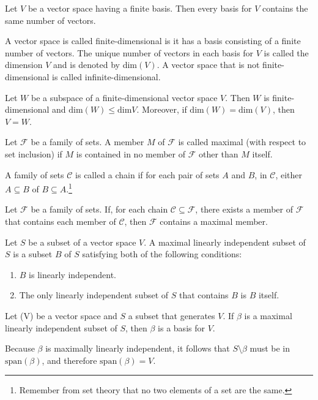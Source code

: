 \documentclass[nobib,notoc]{tufte-handout}
\begin{document}
\begin{cor}
	Let \(V\) be a vector space having a finite basis. Then every basis for \(V\) contains the same number of vectors.
\end{cor}
\begin{defi}[dimension]
A vector space is called finite-dimensional is it has a basis consisting of a finite number of vectors. The unique number of vectors in each basis for \(V\) is called the dimension \(V\) and is denoted by dim\((V)\). A vector space that is not finite-dimensional is called infinite-dimensional.
\end{defi}
\begin{cor}
	Let \(W\) be a subspace of a finite-dimensional vector space \(V\). Then \(W\) is finite-dimensional and \(\text{dim}(W)\leq\text{dim}V\). Moreover, if \(\text{dim}(W)=\text{dim}(V)\), then \(V=W\).
\end{cor}
\begin{defi}
	Let \(\mathcal{F}\) be a family of sets. A member \(M\) of \(\mathcal{F}\) is called maximal (with respect to set inclusion) if \(M\) is contained in no member of \(\mathcal{F}\) other than \(M\) itself.
\end{defi}
\begin{defi}[Chain]
	A family of sets \(\mathcal{C}\) is called a chain if for each pair of sets \(A\) and \(B\), in \(\mathcal{C}\), either \(A\subseteq B\) of \(B\subseteq A\).\footnote{Remember from set theory that no two elements of a set are the same.}
\end{defi}
\begin{defi}
	Let \(\mathcal{F}\) be a family of sets. If, for each chain \(\mathcal{C}\subseteq\mathcal{F}\), there exists a member of \(\mathcal{F}\) that contains each member of \(\mathcal{C}\), then \(\mathcal{F}\) contains a maximal member.
\end{defi}
\begin{defi}
	Let \(S\) be a subset of a vector space \(V\). A maximal linearly independent subset of \(S\) is a subset \(B\) of \(S\) satisfying both of the following conditions:
	\begin{enumerate}
		\item \(B\) is linearly independent.
		\item The only linearly independent subset of \(S\) that contains \(B\) is \(B\) itself.
	\end{enumerate}
\end{defi}
\begin{thm}
	Let (V) be a vector space and \(S\) a subset that generates \(V\). If \(\beta\) is a maximal linearly independent subset of \(S\), then \(\beta\) is a basis for \(V\).
	\begin{IEEEproof}
		Because \(\beta\) is maximally linearly independent, it follows that \(S\setminus\beta\) must be in \(\text{span}(\beta)\), and therefore \(\text{span}(\beta)=V\).
	\end{IEEEproof}
\end{thm}
\end{document}
